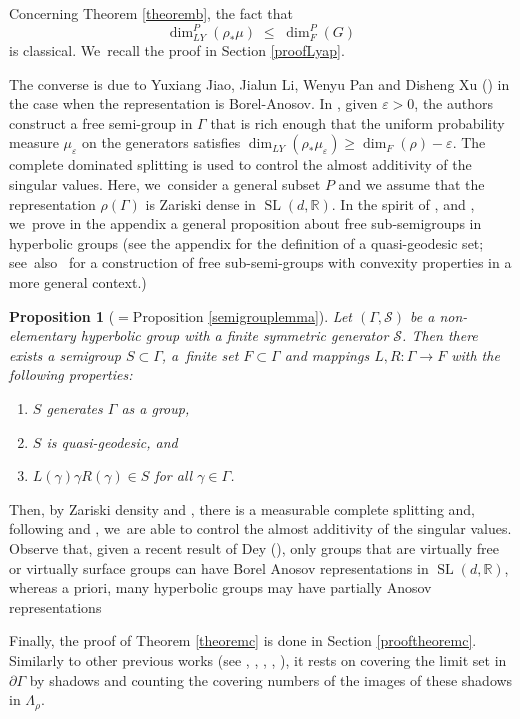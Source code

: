 \documentclass[JEP,XML,SOM,Unicode,NoEqCountersInSection,published]{cedram}
\newtheorem{proposition}[theorem]{Proposition}
\newcommand{\R}{\mathbb{R}}
\newcommand{\cS}{\mathcal{S}}
\let\e\varepsilon
\let\G\Gamma
\let\La\Lambda
\DeclareMathOperator{\SL}{SL}
\begin{document}
Concerning Theorem \ref{theoremb}, the fact that
\begin{equation}\label{LyapleqFalc} \dim_{LY}^P(\rho_*\mu) \; \leq \; \dim_F^P (G) \end{equation} is classical. We~recall the proof in Section \ref{proofLyap}.

The converse is due to Yuxiang Jiao, Jialun Li, Wenyu Pan and Disheng Xu (\cite{JLPX23}) in the case when the representation is Borel-Anosov. In \cite{JLPX23}, given \(\e>0\), the authors construct a free semi-group in \(\G\) that is rich enough that the uniform probability measure \(\mu_\e \) on the generators satisfies \(\dim_{LY}(\rho_*\mu_\e) \ge \dim_F(\rho) -\e\). The complete dominated splitting is used to control the almost additivity of the singular values.
Here, we~consider a general subset \(P\) and we assume that the representation \(\rho(\G)\) is Zariski dense in \(\SL(d,\R)\). In the spirit of \cite{gouezel}, \cite{random} and \cite{JLPX23}, we~prove in the appendix a general proposition about free sub-semigroups in hyperbolic groups (see the appendix for the definition of a quasi-geodesic set; see~also~\cite{yang} for a construction of free sub-semi-groups with convexity properties in a more general context.)
\begin{proposition}[$={}$Proposition \ref{semigrouplemma}]
Let \((\Gamma,\cS)\) be a non-elementary hyperbolic group with a finite symmetric generator \(\cS\). Then there exists a semigroup \(S \subset \Gamma\), a~finite set \(F \subset \Gamma\) and mappings \(L,R:\Gamma \to F\) with the following properties:
\begin{enumerate}
\item \(S\) generates \(\Gamma\) as a group,
\item \(S\) is quasi-geodesic, and
\item \(L(\gamma)\gamma R(\gamma) \in S\) for all \(\gamma \in \Gamma\).
\end{enumerate}
\end{proposition}
Then, by Zariski density and \cite{AMS95}, there is a measurable complete splitting and, following \cite{Ben96} and \cite{2021breuillard-sert}, we~are able to control the almost additivity of the singular values. Observe that, given a recent result of Dey (\cite{Dey24}), only groups that are virtually free or virtually surface groups can have Borel Anosov representations in \(\SL (d, \R)\), whereas a priori, many hyperbolic groups may have partially Anosov representations

Finally, the proof of Theorem \ref{theoremc} is done in Section \ref{prooftheoremc}. Similarly to other previous works (see \cite{Zha97}, \cite{BCH10}, \cite{PSW21}, \cite{GMT19}, \cite{FS20}), it rests on covering the limit set in \(\partial \G \) by shadows and counting the covering numbers of the images of these shadows in \(\La_\rho \).
\end{document}
